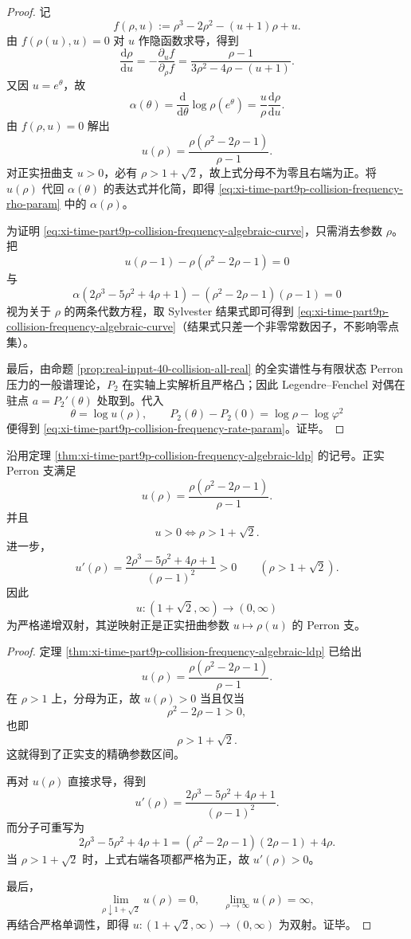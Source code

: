 \begin{proof}
记
\[
f(\rho,u):=\rho^3-2\rho^2-(u+1)\rho+u.
\]
由 \(f(\rho(u),u)=0\) 对 \(u\) 作隐函数求导，得到
\[
\frac{\mathrm d\rho}{\mathrm du}
=-\frac{\partial_u f}{\partial_\rho f}
=\frac{\rho-1}{3\rho^2-4\rho-(u+1)}.
\]
又因 \(u=e^\theta\)，故
\[
\alpha(\theta)=\frac{\mathrm d}{\mathrm d\theta}\log\rho(e^\theta)
=\frac{u}{\rho}\frac{\mathrm d\rho}{\mathrm du}.
\]
由 \(f(\rho,u)=0\) 解出
\[
u(\rho)=\frac{\rho(\rho^2-2\rho-1)}{\rho-1}.
\]
对正实扭曲支 \(u>0\)，必有 \(\rho>1+\sqrt2\)，故上式分母不为零且右端为正。将 \(u(\rho)\) 代回 \(\alpha(\theta)\) 的表达式并化简，即得
\eqref{eq:xi-time-part9p-collision-frequency-rho-param} 中的 \(\alpha(\rho)\)。

为证明 \eqref{eq:xi-time-part9p-collision-frequency-algebraic-curve}，只需消去参数 \(\rho\)。把
\[
u(\rho-1)-\rho(\rho^2-2\rho-1)=0
\]
与
\[
\alpha(2\rho^3-5\rho^2+4\rho+1)-(\rho^2-2\rho-1)(\rho-1)=0
\]
视为关于 \(\rho\) 的两条代数方程，取 Sylvester 结果式即可得到
\eqref{eq:xi-time-part9p-collision-frequency-algebraic-curve}（结果式只差一个非零常数因子，不影响零点集）。

最后，由命题 \ref{prop:real-input-40-collision-all-real} 的全实谱性与有限状态 Perron 压力的一般谱理论，\(P_2\) 在实轴上实解析且严格凸；因此 Legendre--Fenchel 对偶在驻点
\(
a=P_2'(\theta)
\)
处取到。代入
\[
\theta=\log u(\rho),
\qquad
P_2(\theta)-P_2(0)=\log\rho-\log\varphi^2
\]
便得到 \eqref{eq:xi-time-part9p-collision-frequency-rate-param}。证毕。
\end{proof}

\begin{theorem}\label{thm:xi-time-part9p-collision-pressure-rational-monotone-branch}
沿用定理 \ref{thm:xi-time-part9p-collision-frequency-algebraic-ldp} 的记号。正实 Perron 支满足
\[
\boxed{\;
u(\rho)=\frac{\rho(\rho^2-2\rho-1)}{\rho-1}.\;}
\]
并且
\[
\boxed{\;
u>0
\iff
\rho>1+\sqrt2.\;}
\]
进一步，
\[
\boxed{\;
u'(\rho)=\frac{2\rho^3-5\rho^2+4\rho+1}{(\rho-1)^2}>0
\qquad(\rho>1+\sqrt2).\;}
\]
因此
\[
u:(1+\sqrt2,\infty)\longrightarrow (0,\infty)
\]
为严格递增双射，其逆映射正是正实扭曲参数 \(u\mapsto \rho(u)\) 的 Perron 支。
\end{theorem}
\begin{proof}
定理 \ref{thm:xi-time-part9p-collision-frequency-algebraic-ldp} 已给出
\[
u(\rho)=\frac{\rho(\rho^2-2\rho-1)}{\rho-1}.
\]
在 \(\rho>1\) 上，分母为正，故 \(u(\rho)>0\) 当且仅当
\[
\rho^2-2\rho-1>0,
\]
也即
\[
\rho>1+\sqrt2.
\]
这就得到了正实支的精确参数区间。

再对 \(u(\rho)\) 直接求导，得到
\[
u'(\rho)=\frac{2\rho^3-5\rho^2+4\rho+1}{(\rho-1)^2}.
\]
而分子可重写为
\[
2\rho^3-5\rho^2+4\rho+1
=
(\rho^2-2\rho-1)(2\rho-1)+4\rho.
\]
当 \(\rho>1+\sqrt2\) 时，上式右端各项都严格为正，故 \(u'(\rho)>0\)。

最后，
\[
\lim_{\rho\downarrow 1+\sqrt2}u(\rho)=0,
\qquad
\lim_{\rho\to\infty}u(\rho)=\infty,
\]
再结合严格单调性，即得 \(u:(1+\sqrt2,\infty)\to(0,\infty)\) 为双射。证毕。
\end{proof}

